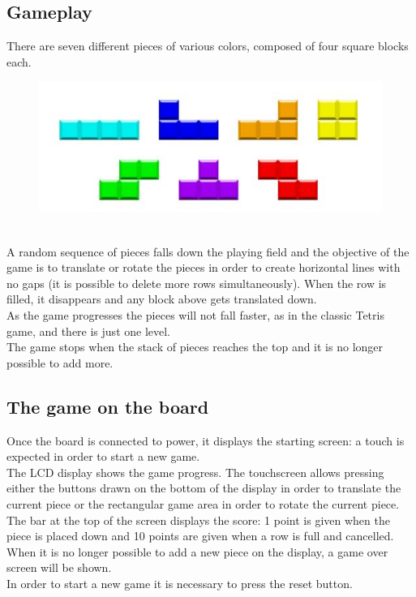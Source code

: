 \documentclass[18pt,oneside,a4paper, titlepage]{article}
\begin{document}
	\subsection{Gameplay}
		There are seven different pieces of various colors, composed of four square blocks each.\\
		\begin{figure}[h]
			\centering
			\includegraphics[scale=0.7]{blocks.jpg}
		\end{figure}
		\\
		A random sequence of pieces falls down the playing field and the objective of the game is to translate or rotate the pieces in order to create horizontal lines with no gaps (it is possible to delete more rows simultaneously). When the row is filled, it disappears and any block above gets translated down.\\
		As the game progresses the pieces will not fall faster, as in the classic Tetris game, and there is just one level.\\The game stops when the stack of pieces reaches the top and it is no longer possible to add more. 
	\subsection{The game on the board}
		Once the board is connected to power, it displays the starting screen: a touch is expected in order to start a new game.\\
		The LCD display shows the game progress. The touchscreen allows pressing either the buttons drawn on the bottom of the display in order to translate the current piece or the rectangular game area in order to rotate the current piece.\\
		The bar at the top of the screen displays the score: 1 point is given when the piece is placed down and 10 points are given when a row is full and cancelled.\\
		When it is no longer possible to add a new piece on the display, a game over screen will be shown.\\
		In order to start a new game it is necessary to press the reset button.
\newpage
\end{document}
